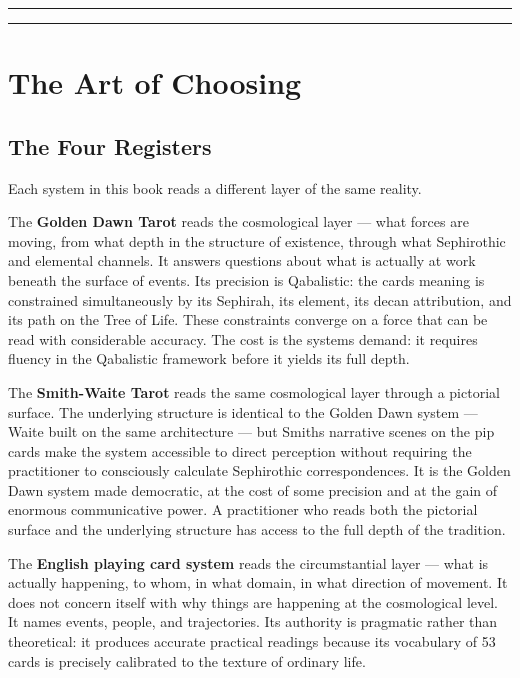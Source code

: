 \begin{center}\rule{0.5\linewidth}{0.5pt}\end{center}

\begin{center}\rule{0.5\linewidth}{0.5pt}\end{center}

\section{The Art of Choosing}\label{final-chapter-the-four-instruments-in-practice}

\subsection{The Four Registers}\label{the-four-registers}

Each system in this book reads a different layer of the same reality.

The \textbf{Golden Dawn Tarot} reads the cosmological layer --- what forces are moving, from what depth in the structure of existence, through what Sephirothic and elemental channels. It answers questions about what is actually at work beneath the surface of events. Its precision is Qabalistic: the card\textquotesingle s meaning is constrained simultaneously by its Sephirah, its element, its decan attribution, and its path on the Tree of Life. These constraints converge on a force that can be read with considerable accuracy. The cost is the system\textquotesingle s demand: it requires fluency in the Qabalistic framework before it yields its full depth.

The \textbf{Smith-Waite Tarot} reads the same cosmological layer through a pictorial surface. The underlying structure is identical to the Golden Dawn system --- Waite built on the same architecture --- but Smith\textquotesingle s narrative scenes on the pip cards make the system accessible to direct perception without requiring the practitioner to consciously calculate Sephirothic correspondences. It is the Golden Dawn system made democratic, at the cost of some precision and at the gain of enormous communicative power. A practitioner who reads both the pictorial surface and the underlying structure has access to the full depth of the tradition.

The \textbf{English playing card system} reads the circumstantial layer --- what is actually happening, to whom, in what domain, in what direction of movement. It does not concern itself with why things are happening at the cosmological level. It names events, people, and trajectories. Its authority is pragmatic rather than theoretical: it produces accurate practical readings because its vocabulary of 53 cards is precisely calibrated to the texture of ordinary life.

